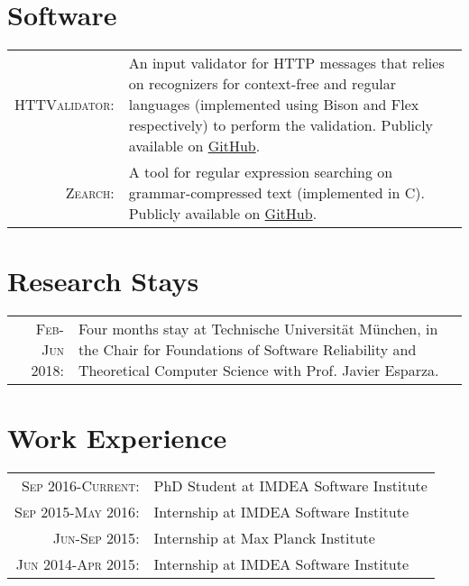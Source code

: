 \documentclass[a4paper,10pt]{article} %
\begin{document}
\section{Software}

\begin{tabular}{rp{11cm}}
\textsc{HTTValidator}: & An input validator for HTTP messages that relies on recognizers for context-free and regular languages (implemented using Bison and Flex respectively) to perform the validation. Publicly available on \href{https://github.com/pevalme/HTTPValidator}{GitHub}. \\

\textsc{Zearch}: & A tool for regular expression searching on grammar-compressed text (implemented in C). Publicly available on \href{https://github.com/pevalme/zearch}{GitHub}.\\
\end{tabular}


\section{Research Stays}

\begin{tabular}{rp{13cm}}
\textsc{Feb-Jun 2018}: & Four months stay at Technische Universität München, in the Chair for Foundations of Software Reliability and Theoretical Computer Science with Prof. Javier Esparza. 
\end{tabular}


\section{Work Experience}

\begin{tabular}{rp{11cm}}
\textsc{Sep 2016-Current}: & PhD Student at IMDEA Software Institute\\

\textsc{Sep 2015-May 2016}: & Internship at IMDEA Software Institute\\

\textsc{Jun-Sep 2015}: & Internship at Max Planck Institute\\

\textsc{Jun 2014-Apr 2015}: & Internship at IMDEA Software Institute\\
\end{tabular}
\end{document}
